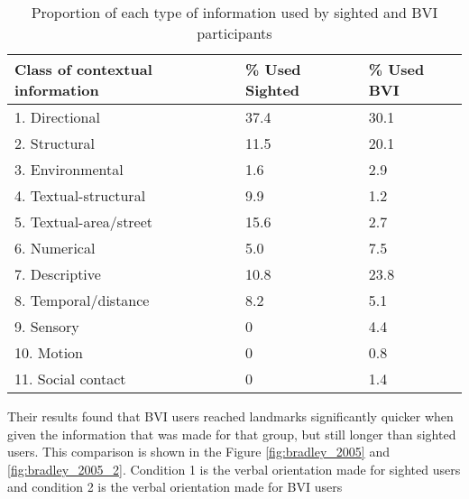 \begin{table}[htbp]
    \centering
    \caption{Proportion of each type of information used by sighted and BVI participants \cite{bradley2005experimental}}
    \begin{tabular}{|l|l|l|}
        \hline
        \textbf{Class of contextual information} & \textbf{\% Used Sighted} & \textbf{\% Used BVI} \\ \hline
        1. Directional                           & 37.4                     & 30.1                 \\ \hline
        2. Structural                            & 11.5                     & 20.1                 \\ \hline
        3. Environmental                         & 1.6                      & 2.9                  \\ \hline
        4. Textual-structural                    & 9.9                      & 1.2                  \\ \hline
        5. Textual-area/street                   & 15.6                     & 2.7                  \\ \hline
        6. Numerical                             & 5.0                      & 7.5                  \\ \hline
        7. Descriptive                           & 10.8                     & 23.8                 \\ \hline
        8. Temporal/distance                     & 8.2                      & 5.1                  \\ \hline
        9. Sensory                               & 0                        & 4.4                  \\ \hline
        10. Motion                               & 0                        & 0.8                  \\ \hline
        11. Social contact                       & 0                        & 1.4                  \\ \hline
    \end{tabular}
    \label{tab:bradley_2005_table}
\end{table}

Their results found that BVI users reached landmarks significantly quicker when given the information that was made for that group, but still longer than sighted users. This comparison is shown in the Figure \ref{fig:bradley_2005} and \ref{fig:bradley_2005_2}. Condition 1 is the verbal orientation made for sighted users and condition 2 is the verbal orientation made for BVI users

